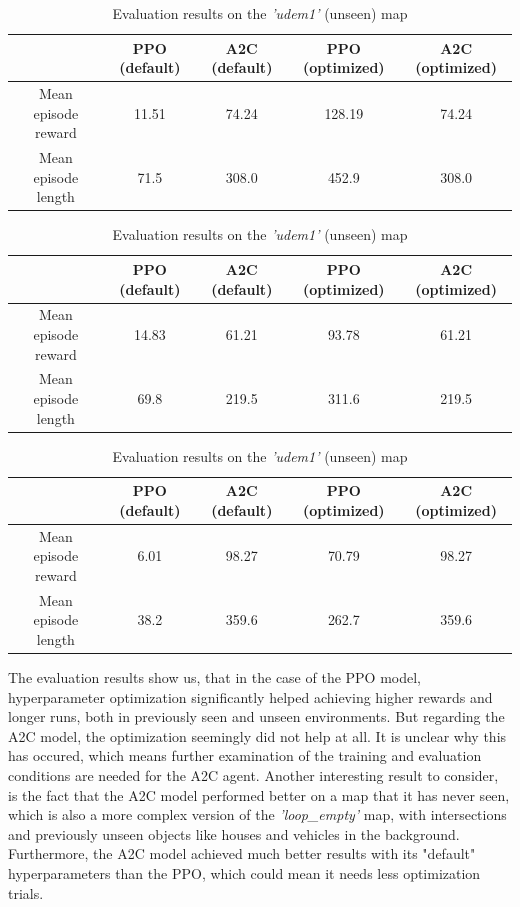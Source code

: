 \documentclass{article}
\begin{document}
\begin{table}[H]
	\caption{Evaluation results on the \textit{'zigzag\_dists'} (seen) map}
	\begin{center}
	\begin{tabular}{|c| c| c| c| c|}
		\hline
	  & PPO (default) & A2C (default) & PPO (optimized) & A2C (optimized) \\
	\hline
	Mean episode reward & 11.51 & 74.24 & 128.19 & 74.24 \\
	\hline
	Mean episode length & 71.5 & 308.0 & 452.9& 308.0 \\
	\hline
	\end{tabular}
	\end{center}
	\label{t:zigzagdists}

	\caption{Evaluation results on the \textit{'loop\_empty'} (unseen) map}
	\begin{center}
	\begin{tabular}{|c| c | c| c | c|}
		\hline
	  & PPO (default) & A2C (default) & PPO (optimized) & A2C (optimized) \\
	\hline
	Mean episode reward & 14.83 & 61.21 & 93.78 & 61.21 \\
	\hline
	Mean episode length & 69.8 & 219.5 & 311.6 & 219.5 \\
	\hline
	\end{tabular}
	\end{center}
	\label{t:smalloop}

	\caption{Evaluation results on the \textit{'udem1'} (unseen) map}
	\begin{center}
	\begin{tabular}{|c| c| c| c| c|}
		\hline
	  & PPO (default) & A2C (default) & PPO (optimized) & A2C (optimized) \\
	\hline
	Mean episode reward & 6.01 & 98.27 & 70.79 & 98.27 \\
	\hline
	Mean episode length & 38.2 & 359.6 & 262.7 & 359.6 \\
	\hline
	\end{tabular}
	\end{center}
	\label{t:udem1}
\end{table}

The evaluation results show us, that in the case of the PPO model, hyperparameter optimization significantly helped achieving higher rewards and longer runs, both in previously seen and unseen environments. 
But regarding the A2C model, the optimization seemingly did not help at all. It is unclear why this has occured, which means further examination of the training and evaluation conditions are needed for the A2C agent.
Another interesting result to consider, is the fact that the A2C model performed better on a map that it has never seen, which is also a more complex version of the \textit{'loop\_empty'} map, with intersections and previously unseen objects like houses and vehicles in the background.
Furthermore, the A2C model achieved much better results with its "default" hyperparameters than the PPO, which could mean it needs less optimization trials. 
\end{document}
